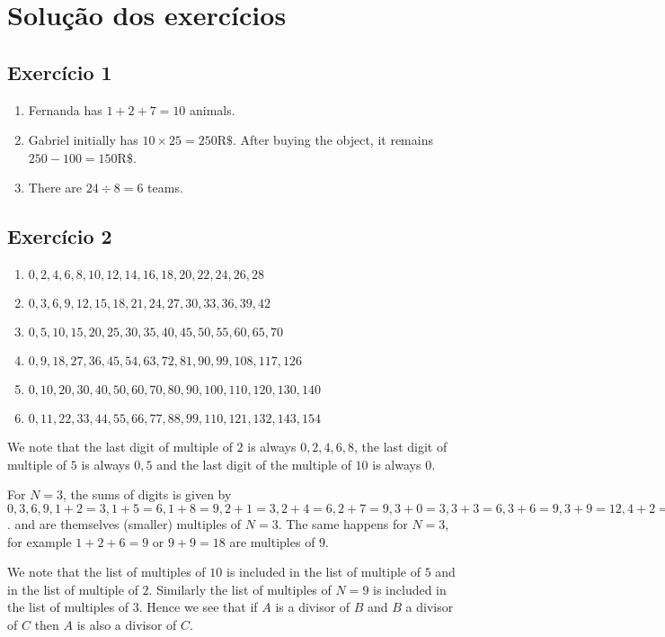 \section{Solução dos exercícios}

\subsection*{Exercício 1}

\begin{enumerate}
\item Fernanda has $1+2+7=10$ animals.
\item Gabriel initially has $10 \times 25 = 250\text{R\$}$. After buying the
  object, it remains $250 - 100 = 150\text{R\$}$.
\item There are $24 \div 8 =6$ teams.
\end{enumerate}

\subsection*{Exercício 2}

\begin{enumerate}
\item $ 0, 2, 4, 6, 8,10,12,14,16,18,20,22, 24,26,28$
\item $ 0, 3, 6, 9,12,15,18,21,24,27,30,33, 36,39,42$
\item $ 0, 5,10,15,20,25,30,35,40,45,50,55, 60,65,70$
\item $ 0, 9,18,27,36,45,54,63,72,81,90,99,108,117,126$
\item $  0, 10, 20, 30, 40, 50, 60, 70, 80, 90,100,110,120,130,140$
\item $  0, 11, 22, 33, 44, 55, 66, 77, 88, 99,110,121,132,143,154$
\end{enumerate}

We note that the last digit of multiple of $2$ is always $0,2,4,6,8$,
the last digit of multiple of $5$ is always $0,5$ and the last digit of the
multiple of $10$ is always $0$.

For $N=3$, the sums of digits is given by
$0,3,6,9,1+2=3,1+5=6,1+8=9,2+1=3,2+4=6,2+7=9,3+0=3,3+3=6,3+6=9,3+9=12,4+2=6$.
and are themselves (smaller) multiples of $N=3$. The same happens for $N=3$,
for example $1+2+6=9$ or $9+9=18$ are multiples of $9$.

We note that the list of multiples of $10$ is included in the list
of multiple of $5$ and in the list of multiple of $2$. Similarly the list of
multiples of $N=9$ is included in the list of multiples of $3$. Hence we see
that if $A$ is a divisor of $B$ and $B$ a divisor of $C$ then $A$ is also a
divisor of $C$.

